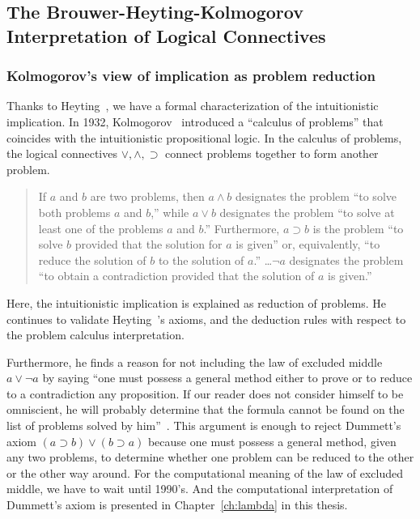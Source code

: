\subsection{The Brouwer-Heyting-Kolmogorov Interpretation of Logical Connectives}

\subsubsection{Kolmogorov's view of implication as problem reduction}

Thanks to Heyting~\cite{heyting1930}, we have a formal
characterization of the intuitionistic implication.
In 1932, Kolmogorov~\cite{kolmogorov1932} introduced a ``calculus of problems''
that coincides with the intuitionistic propositional logic.
In the calculus of problems, the logical connectives $\vee, \wedge,
\supset$ connect problems together to form another problem.
 \begin{quote}
  If $a$ and $b$ are two problems, then $a\land b$ designates the
  problem ``to solve both problems $a$ and $b$,'' while $a\lor b$
  designates the problem ``to solve at least one of the problems $a$ and
  $b$.''  Furthermore, $a\supset b$ is the problem ``to solve $b$
  provided that the solution for $a$ is given'' or, equivalently, ``to
  reduce the solution of $b$ to the solution of
  $a$.''  \ldots $\neg a$ designates the problem ``to obtain a
  contradiction provided that the solution of $a$ is
  given.''~\cite[p.~329]{kolmogorov1932}
 \end{quote}
 Here, the intuitionistic implication
 is explained as reduction of problems.
 He continues to validate Heyting~\cite{heyting1930}'s axioms, and the
 deduction rules with respect to the problem calculus interpretation.

 Furthermore, he finds a reason for not including the law of excluded
 middle $a\lor \neg a$ by saying ``one must possess a general method
 either to prove or to reduce to a contradiction any proposition.  If
 our reader does not consider himself to be omniscient, he will probably
 determine that the formula cannot be found on the list of problems
 solved by him''~\cite{kolmogorov1932}.
 This argument is enough to reject Dummett's axiom $(a\supset b)\lor
 (b\supset a)$ because one must possess a general method, given any two
 problems, to
 determine whether
 one problem can be reduced to the other or the other way around.
 For the computational meaning of the law of excluded middle, we have to
 wait until 1990's.
 And the computational interpretation of Dummett's axiom is
 presented in Chapter~\ref{ch:lambda} in this thesis.

